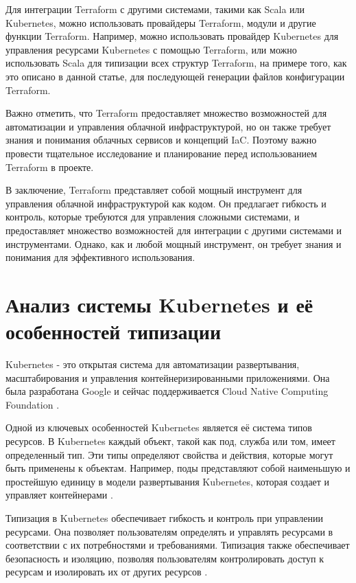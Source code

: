 Для интеграции Terraform с другими системами, такими как Scala или
Kubernetes, можно использовать провайдеры Terraform, модули и другие
функции Terraform. Например, можно использовать провайдер Kubernetes
для управления ресурсами Kubernetes с помощью Terraform, или можно
использовать Scala для типизации всех структур 
Terraform\cite{shapkin-automation-2022}, на примере того,
как это описано в данной статье, для последующей
генерации файлов конфигурации Terraform.

Важно отметить, что Terraform предоставляет множество возможностей
для автоматизации и управления облачной инфраструктурой, но он также
требует знания и понимания облачных сервисов и концепций IaC.
Поэтому важно провести тщательное исследование и планирование перед
использованием Terraform в проекте.

В заключение, Terraform представляет собой мощный инструмент для
управления облачной инфраструктурой как кодом. Он предлагает гибкость
и контроль, которые требуются для управления сложными системами,
и предоставляет множество возможностей для интеграции с другими
системами и инструментами. Однако, как и любой мощный инструмент,
он требует знания и понимания для эффективного использования.

\section{Анализ системы Kubernetes и её особенностей типизации}

Kubernetes - это открытая система для автоматизации развертывания,
масштабирования и управления контейнеризированными приложениями.
Она была разработана Google и сейчас поддерживается Cloud Native Computing
Foundation \cite{bernstein-containers-2014}.

Одной из ключевых особенностей Kubernetes является её система типов
ресурсов. В Kubernetes каждый объект, такой как под, служба или том,
имеет определенный тип. Эти типы определяют свойства и действия, которые
могут быть применены к объектам. Например, поды представляют собой
наименьшую и простейшую единицу в модели развертывания Kubernetes,
которая создает и управляет контейнерами \cite{sayfan2017mastering}.

Типизация в Kubernetes обеспечивает гибкость и контроль при управлении
ресурсами. Она позволяет пользователям определять и управлять ресурсами
в соответствии с их потребностями и требованиями. Типизация также
обеспечивает безопасность и изоляцию, позволяя пользователям контролировать
доступ к ресурсам и изолировать их от других ресурсов \cite{bijon2014formal}.

